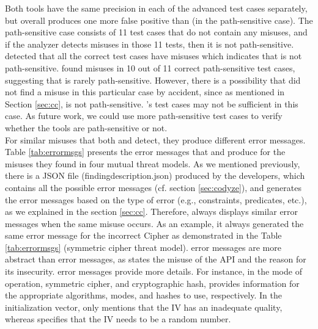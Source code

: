 Both tools have the same precision in each of the advanced test cases separately, but overall \codyze{} produces one more false positive than \cognicryptsast{} (in the path-sensitive case). The path-sensitive case consists of 11 test cases that do not contain any misuses, and if the analyzer detects misuses in those 11 tests, then it is not path-sensitive. \codyze{} detected that all the correct test cases have misuses which indicates that \codyze{} is not path-sensitive.
\cognicryptsast{} found misuses in 10 out of 11 correct path-sensitive test cases, suggesting that \cognicryptsast{} is rarely path-sensitive. However, there is a possibility that \cognicryptsast{} did not find a misuse in this particular case by accident, since as mentioned in Section \ref{sec:cc}, \cognicryptsast is not path-sensitive. \cryptoapibench's test cases may not be sufficient in this case. As future work, we could use more path-sensitive test cases to verify whether the tools are path-sensitive or not.
\\

For similar misuses that both \codyze{} and \cognicryptsast{} detect, they produce different error messages. Table \ref{tab:errormsgs} presents the error messages that \codyze{} and \cognicryptsast{} produce for the misuses they found in four mutual threat models. As we mentioned previously, there is a JSON file (findingdescription.json) produced by the \codyze{} developers, which contains all the possible error messages (cf. section \ref{sec:codyze}), and \cognicryptsast{} generates the error messages based on the type of error (e.g., constraints, predicates, etc.), as we explained in the section \ref{sec:cc}. Therefore, \codyze{} always displays similar error messages when the same misuse occurs. As an example, it always generated the same error message for the incorrect Cipher as demonstrated in the Table \ref{tab:errormsgs} (symmetric cipher threat model). \codyze{} error messages are more abstract than \cognicryptsast{} error messages, as \codyze{} states the misuse of the API and the reason for its insecurity. \cognicryptsast{} error messages provide more details. For instance, in the mode of operation, symmetric cipher, and cryptographic hash, \cognicryptsast{} provides information for the appropriate algorithms, modes, and hashes to use, respectively. In the initialization vector, \codyze{} only mentions that the IV has an inadequate quality, whereas \cognicryptsast{} specifies that the IV needs to be a random number.

